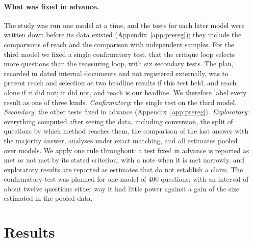 \documentclass[11pt]{article}
\begin{document}
\paragraph{What was fixed in advance.}
The study was run one model at a time, and the tests for each later model were written down before its data existed (Appendix~\ref{app:prereg}); they include the comparisons of reach and the comparison with independent samples.
For the third model we fixed a single confirmatory test, that the critique loop selects more questions than the reassuring loop, with six secondary tests.
The plan, recorded in dated internal documents and not registered externally, was to present reach and selection as two headline results if this test held, and reach alone if it did not; it did not, and reach is our headline.
We therefore label every result as one of three kinds.
\emph{Confirmatory}: the single test on the third model.
\emph{Secondary}: the other tests fixed in advance (Appendix~\ref{app:prereg}).
\emph{Exploratory}: everything computed after seeing the data, including conversion, the split of questions by which method reaches them, the comparison of the last answer with the majority answer, analyses under exact matching, and all estimates pooled over models.
We apply one rule throughout: a test fixed in advance is reported as met or not met by its stated criterion, with a note when it is met narrowly, and exploratory results are reported as estimates that do not establish a claim.
The confirmatory test was planned for one model of 400 questions; with an interval of about twelve questions either way it had little power against a gain of the size estimated in the pooled data.

\section{Results}
\end{document}
